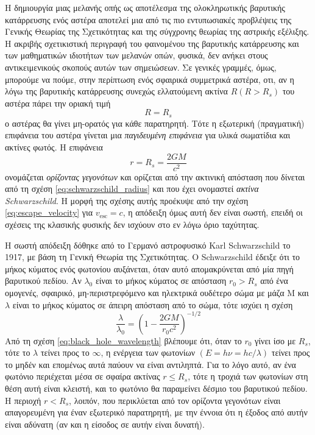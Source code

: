 Η δημιουργία μιας μελανής οπής ως αποτέλεσμα της ολοκληρωτικής βαρυτικής κατάρρευσης ενός αστέρα αποτελεί μια από τις πιο εντυπωσιακές προβλέψεις της Γενικής Θεωρίας της Σχετικότητας και της σύγχρονης θεωρίας της αστρικής εξέλιξης. Η ακριβής σχετικιστική περιγραφή του φαινομένου της βαρυτικής κατάρρευσης και των μαθηματικών ιδιοτήτων των μελανών οπών, φυσικά, δεν ανήκει στους αντικειμενικούς σκοπούς αυτών των σημειώσεων. Σε γενικές γραμμές, όμως, μπορούμε να πούμε, στην περίπτωση ενός σφαιρικά συμμετρικά αστέρα, οτι, αν η λόγω της βαρυτικής κατάρρευσης συνεχώς ελλατούμενη ακτίνα $R(R > R_s)$ του αστέρα πάρει την οριακή τιμή
$$R = R_s$$
ο αστέρας θα γίνει μη-ορατός για κάθε παρατηρητή. Τότε η εξωτερική (πραγματική) επιφάνεια του αστέρα γίνεται μια \textit{παγιδευμένη επιφάνεια} για υλικά σωματίδια και ακτίνες φωτός. Η επιφάνεια
\begin{equation}
	r = R_s = \frac{2GM}{c^2}
    \label{eq:schwarzschild_radius}
\end{equation}
ονομάζεται \textit{ορίζοντας γεγονότων} και ορίζεται από την ακτινική απόσταση που δίνεται από τη σχέση \eqref{eq:schwarzschild_radius} και που έχει ονομαστεί \textit{ακτίνα Schwarzschild}. Η μορφή της σχέσης αυτής προέκυψε από την σχέση \eqref{eq:escape_velocity} για $v_{\text{esc}} = c$, η απόδειξη όμως αυτή δεν είναι σωστή, επειδή οι σχέσεις της κλασικής φυσικής δεν ισχύουν στο εν λόγω όριο ταχύτητας.

Η σωστή απόδειξη δόθηκε από το Γερμανό αστροφυσικό Karl Schwarzschild το 1917, με βάση τη Γενική Θεωρία της Σχετικότητας. Ο Schwarzschild έδειξε ότι το μήκος κύματος ενός φωτονίου αυξάνεται, όταν αυτό απομακρύνεται από μία πηγή βαρυτικού πεδίου. Αν $\lambda_0$ είναι το μήκος κύματος σε απόσταση $r_0 > R_s$ από ένα ομογενές, σφαιρικό, μη-περιστρεφόμενο και ηλεκτρικά ουδέτερο σώμα με μάζα Μ και $\lambda$ είναι το μήκος κύματος σε άπειρη απόσταση από το σώμα, τότε ισχύει η σχέση
\begin{equation}
	\frac{\lambda}{\lambda_0} = \left( 1 - \frac{2GM}{r_0 c^2} \right)^{-1/2}
    \label{eq:black_hole_wavelength}
\end{equation}
Από τη σχέση \eqref{eq:black_hole_wavelength} βλέπουμε ότι, όταν το $r_0$ γίνει ίσο με $R_s$, τότε το $\lambda$ τείνει προς το $\infty$, η ενέργεια των φωτονίων $(E = h\nu = hc/\lambda)$ τείνει προς το μηδέν και επομένως αυτά παύουν να είναι αντιληπτά. Για το λόγο αυτό, αν ένα φωτόνιο περιέχεται μέσα σε σφαίρα ακτίνας $r \leq R_s$, τότε η τροχιά των φωτονίων στη θέση αυτή είναι κλειστή, και το φωτόνιο θα παραμείνει δέσμιο του βαρυτικού πεδίου. Η περιοχή $r < R_s$, λοιπόν, που περικλύεται από τον ορίζοντα γεγονότων είναι απαγορευμένη για έναν εξωτερικό παρατηρητή, με την έννοια ότι η έξοδος από αυτήν είναι αδύνατη (αν και η είσοδος σε αυτήν είναι δυνατή).


